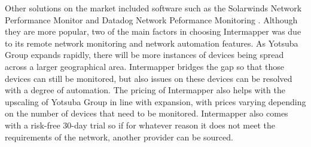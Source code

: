 Other solutions on the market included software such as the Solarwinds Network Performance Monitor \parencite{solarwinds} and Datadog Network Peformance Monitoring \parencite{datadog}. Although they are more popular, two of the main factors in choosing Intermapper was due to its remote network monitoring and network automation features. As Yotsuba Group expands rapidly, there will be more instances of devices being spread across a larger geographical area. Intermapper bridges the gap so that those devices can still be monitored, but also issues on these devices can be resolved with a degree of automation. The pricing of Intermapper also helps with the upscaling of Yotsuba Group in line with expansion, with prices varying depending on the number of devices that need to be monitored. Intermapper also comes with a risk-free 30-day trial so if for whatever reason it does not meet the requirements of the network, another provider can be sourced.